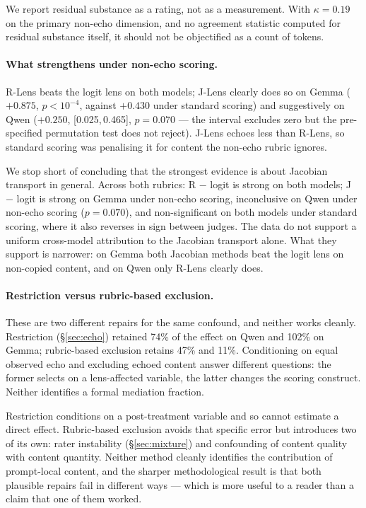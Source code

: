 \documentclass[11pt]{article}
\newcommand{\ci}[2]{[#1,\,#2]}
\newcommand{\flag}[1]{\textcolor{flagged}{#1}}
\begin{document}
We report residual substance as a rating, not as a measurement. With
$\kappa = 0.19$ on the primary non-echo dimension, and no agreement statistic
computed for residual substance itself, it should not be objectified as a count
of tokens.

\paragraph{What strengthens under non-echo scoring.} R-Lens beats the logit
lens on both models; J-Lens clearly does so on Gemma ($+0.875$, $p<10^{-4}$,
against $+0.430$ under standard scoring) and suggestively on Qwen ($+0.250$,
\ci{0.025}{0.465}, $p=0.070$ --- the interval excludes zero but the
pre-specified permutation test does not reject).
J-Lens echoes less than R-Lens, so standard scoring was penalising it for
content the non-echo rubric ignores.

We stop short of concluding that the strongest evidence is about Jacobian
transport in general. Across both rubrics: R $-$ logit is strong on both models;
J $-$ logit is strong on Gemma under non-echo scoring, inconclusive on Qwen
under non-echo scoring ($p=0.070$), and non-significant on both models under
standard scoring, where it also reverses in sign between judges.
\flag{The data do not support a uniform cross-model attribution to the Jacobian
transport alone.} What they support is narrower: on Gemma both Jacobian methods
beat the logit lens on non-copied content, and on Qwen only R-Lens clearly does.

\paragraph{Restriction versus rubric-based exclusion.} These are two different
repairs for the same confound, and neither works cleanly. Restriction
(\S\ref{sec:echo}) retained 74\% of the effect on Qwen and 102\% on Gemma;
rubric-based exclusion retains 47\% and 11\%. Conditioning on equal observed echo and excluding echoed
content answer different questions: the former selects on a lens-affected
variable, the latter changes the scoring construct. Neither identifies a formal
mediation fraction.

Restriction conditions on a post-treatment variable and so cannot estimate a
direct effect. Rubric-based exclusion avoids that specific error but introduces
two of its own: rater instability (\S\ref{sec:mixture}) and confounding of
content quality with content quantity. \flag{Neither method cleanly identifies
the contribution of prompt-local content}, and the sharper methodological result
is that both plausible repairs fail in different ways --- which is more useful to
a reader than a claim that one of them worked.
\end{document}
